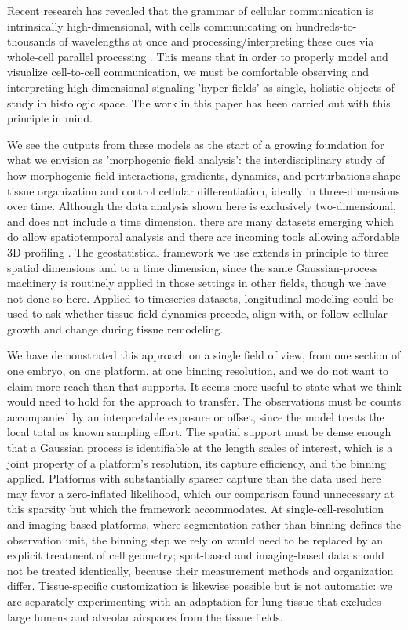 \documentclass[10pt,letterpaper]{article}
\begin{document}
Recent research has revealed that the grammar of cellular communication is intrinsically high-dimensional, with cells communicating on hundreds-to-thousands of wavelengths at once and processing/interpreting these cues via whole-cell parallel processing \cite{Granados2024}. This means that in order to properly model and visualize cell-to-cell communication, we must be comfortable observing and interpreting high-dimensional signaling 'hyper-fields' as single, holistic objects of study in histologic space. The work in this paper has been carried out with this principle in mind.

We see the outputs from these models as the start of a growing foundation for what we envision as 'morphogenic field analysis': the interdisciplinary study of how morphogenic field interactions, gradients, dynamics, and perturbations shape tissue organization and control cellular differentiation, ideally in three-dimensions over time. Although the data analysis shown here is exclusively two-dimensional, and does not include a time dimension, there are many datasets emerging which do allow spatiotemporal analysis and there are incoming tools allowing affordable 3D profiling \cite{Reynolds2025}. The geostatistical framework we use extends in principle to three spatial dimensions and to a time dimension, since the same Gaussian-process machinery is routinely applied in those settings in other fields, though we have not done so here. Applied to timeseries datasets, longitudinal modeling could be used to ask whether tissue field dynamics precede, align with, or follow cellular growth and change during tissue remodeling.

We have demonstrated this approach on a single field of view, from one section of one embryo, on one platform, at one binning resolution, and we do not want to claim more reach than that supports. It seems more useful to state what we think would need to hold for the approach to transfer. The observations must be counts accompanied by an interpretable exposure or offset, since the model treats the local total as known sampling effort. The spatial support must be dense enough that a Gaussian process is identifiable at the length scales of interest, which is a joint property of a platform's resolution, its capture efficiency, and the binning applied. Platforms with substantially sparser capture than the data used here may favor a zero-inflated likelihood, which our comparison found unnecessary at this sparsity but which the framework accommodates. At single-cell-resolution and imaging-based platforms, where segmentation rather than binning defines the observation unit, the binning step we rely on would need to be replaced by an explicit treatment of cell geometry; spot-based and imaging-based data should not be treated identically, because their measurement methods and organization differ. Tissue-specific customization is likewise possible but is not automatic: we are separately experimenting with an adaptation for lung tissue that excludes large lumens and alveolar airspaces from the tissue fields.
\end{document}
